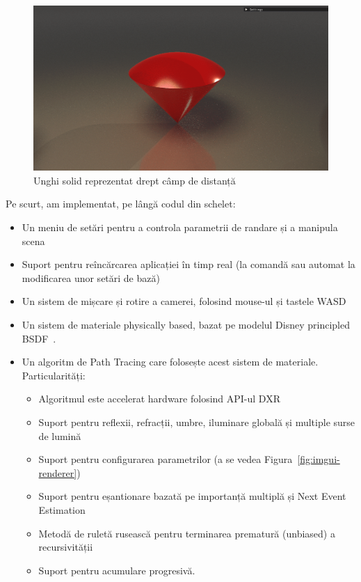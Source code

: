 \documentclass[12pt,a4paper]{report}
\numberwithin{equation}{section} %
\begin{document}
\begin{figure}[!htb]
	\centering
	\includegraphics[width=\textwidth]{pics/solid-angle.png}
	\caption{Unghi solid reprezentat drept câmp de distanță\protect\footnotemark}
	\label{fig:solid-angle}
\end{figure}

Pe scurt, am implementat, pe lângă codul din schelet:
\begin{itemize}
	\item Un meniu de setări pentru a controla parametrii de randare și a manipula scena
	\item Suport pentru reîncărcarea aplicației în timp real (la comandă sau automat la modificarea unor setări de bază)
	\item Un sistem de mișcare și rotire a camerei, folosind mouse-ul și tastele WASD
	\item Un sistem de materiale physically based, bazat pe modelul Disney principled BSDF~\cite{Disney,DisneyBSDF}.
	\item Un algoritm de Path Tracing care folosește acest sistem de materiale. Particularități:
	      \begin{itemize}
		      \item Algoritmul este accelerat hardware folosind API-ul DXR
		      \item Suport pentru reflexii, refracții, umbre, iluminare globală și multiple surse de lumină
		      \item Suport pentru configurarea parametrilor (a se vedea Figura~\ref{fig:imgui-renderer})
		      \item Suport pentru eșantionare bazată pe importanță multiplă și Next Event Estimation
		      \item Metodă de ruletă rusească pentru terminarea prematură (unbiased) a recursivității
		      \item Suport pentru acumulare progresivă.
	      \end{itemize}
\end{itemize}
\end{document}
